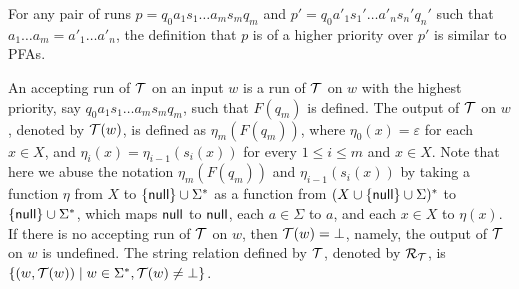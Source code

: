 For any pair of runs $p = q_0 a_1 s_1 \ldots a_m s_m q_m$ and $p' = q_0 a'_1
  s_1' \ldots a'_n s_n' q_n'$ such that $a_1 \ldots a_m = a'_1 \ldots a'_n$, the definition that $p$ is of a higher priority over
  $p'$ is similar to PFAs.
  
An accepting run of $\mathcal{T}$ on an input $w$ is a run of $\mathcal{T}$ on $w$ with the highest priority, say $q_0 a_1 s_1 \ldots a_m s_m q_m$, such that $F(q_m)$ is defined. The output of $\mathcal{T}$ on $w$, denoted by $\mathcal{T}(w)$, is defined as $\eta_m(F(q_m))$, where $\eta_0(x) = \varepsilon$ for each $x \in X$, and $\eta_{i}(x) = \eta_{i-1}(s_{i}(x))$ for every $1 \le i \le m$ and $x \in X$. Note that here we abuse the notation $\eta_m(F(q_m))$ and $\eta_{i-1}(s_{i}(x))$ by taking a function $\eta$ from $X$ to $\{\mathsf{null}\} \cup \Sigma^*$ as a function from $(X \cup \{\mathsf{null}\} \cup \Sigma)^*$ to $\{\mathsf{null}\} \cup \Sigma^*$, which maps $\mathsf{null}$ to $\mathsf{null}$, each $a \in \Sigma$ to $a$, and each $x \in X$ to $\eta(x)$. If there is no accepting run of $\mathcal{T}$ on $w$, then $\mathcal{T}(w) = \bot$, namely, the output of $\mathcal{T}$ on $w$ is undefined. The string relation defined by $\mathcal{T}$, denoted by $\mathcal{R}_{\mathcal{T}}$,  is $\{(w, \mathcal{T}(w)) \mid w \in \Sigma^\ast, \mathcal{T}(w) \neq \bot\}$.


